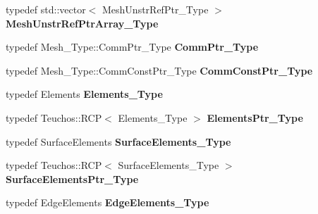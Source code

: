 \begin{DoxyCompactItemize}
\item 
\mbox{\label{classFEDD_1_1AdaptiveMeshRefinement_ad4324c72b3d23a9921152217fbedc161}} 
typedef std\+::vector$<$ Mesh\+Unstr\+Ref\+Ptr\+\_\+\+Type $>$ {\bfseries Mesh\+Unstr\+Ref\+Ptr\+Array\+\_\+\+Type}
\item 
\mbox{\label{classFEDD_1_1AdaptiveMeshRefinement_aa7b0ab20b8659e451330976480944e37}} 
typedef Mesh\+\_\+\+Type\+::\+Comm\+Ptr\+\_\+\+Type {\bfseries Comm\+Ptr\+\_\+\+Type}
\item 
\mbox{\label{classFEDD_1_1AdaptiveMeshRefinement_a96e4037869de7d2d55b318fac0dd68fe}} 
typedef Mesh\+\_\+\+Type\+::\+Comm\+Const\+Ptr\+\_\+\+Type {\bfseries Comm\+Const\+Ptr\+\_\+\+Type}
\item 
\mbox{\label{classFEDD_1_1AdaptiveMeshRefinement_a0b053e56590f8e148fb1b3f48c68141b}} 
typedef Elements {\bfseries Elements\+\_\+\+Type}
\item 
\mbox{\label{classFEDD_1_1AdaptiveMeshRefinement_a655120e9571ded2c66d441c9a1552038}} 
typedef Teuchos\+::\+R\+CP$<$ Elements\+\_\+\+Type $>$ {\bfseries Elements\+Ptr\+\_\+\+Type}
\item 
\mbox{\label{classFEDD_1_1AdaptiveMeshRefinement_a240b95cf08c5e92bbe1a03555dc6f519}} 
typedef Surface\+Elements {\bfseries Surface\+Elements\+\_\+\+Type}
\item 
\mbox{\label{classFEDD_1_1AdaptiveMeshRefinement_a0f79f50fb173e3acc3167279a7f1345a}} 
typedef Teuchos\+::\+R\+CP$<$ Surface\+Elements\+\_\+\+Type $>$ {\bfseries Surface\+Elements\+Ptr\+\_\+\+Type}
\item 
\mbox{\label{classFEDD_1_1AdaptiveMeshRefinement_a4ecf8fe210fc6060b24b37d1955d9a41}} 
typedef Edge\+Elements {\bfseries Edge\+Elements\+\_\+\+Type}
\item 
\mbox{\label{classFEDD_1_1AdaptiveMeshRefinement_a8d86e0d3a5fbf66548b2919590a80342}} 

\end{DoxyCompactItemize}
